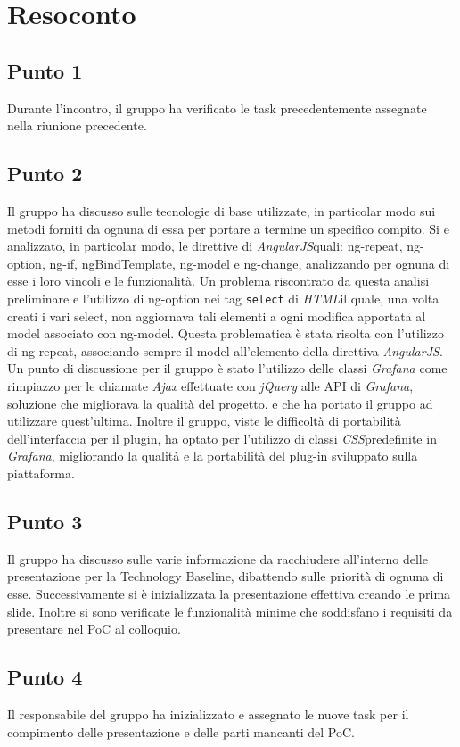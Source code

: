 \section{Resoconto}

\subsection{Punto 1}
Durante l'incontro, il gruppo ha verificato le task precedentemente assegnate nella riunione precedente. 

\subsection{Punto 2}
Il gruppo ha discusso sulle tecnologie di base utilizzate, in particolar modo sui metodi forniti da ognuna di essa per portare a termine un specifico compito. Si e analizzato, in particolar modo, le direttive di \textit{AngularJS}\glossario quali: ng-repeat, ng-option, ng-if, ngBindTemplate, ng-model e ng-change, analizzando per ognuna di esse i loro vincoli e le funzionalità. Un problema riscontrato da questa analisi preliminare e l'utilizzo di ng-option nei tag \texttt{select} di \textit{HTML}\glossario il quale, una volta creati i vari select, non aggiornava tali elementi a ogni modifica apportata al model associato con ng-model. Questa problematica è stata risolta con l'utilizzo di ng-repeat, associando sempre il model all'elemento della direttiva \textit{AngularJS}. Un punto di discussione per il gruppo è stato l'utilizzo delle classi \textit{Grafana} come rimpiazzo per le chiamate \textit{Ajax} effettuate con \textit{jQuery} alle API di \textit{Grafana}, soluzione che migliorava la qualità del progetto, e che ha portato il gruppo ad utilizzare quest'ultima. Inoltre il gruppo, viste le difficoltà di portabilità dell'interfaccia per il plugin, ha optato per l'utilizzo di classi \textit{CSS}\glossario predefinite in \textit{Grafana}, migliorando la qualità e la portabilità del plug-in sviluppato sulla piattaforma. 

\subsection{Punto 3}
Il gruppo ha discusso sulle varie informazione da racchiudere all'interno delle presentazione per la Technology Baseline, dibattendo sulle priorità di ognuna di esse. Successivamente si è inizializzata la presentazione effettiva creando le prima slide. Inoltre si sono verificate le funzionalità minime che soddisfano i requisiti da presentare nel PoC al colloquio. 

\subsection{Punto 4}
Il responsabile del gruppo ha inizializzato e assegnato le nuove task per il compimento delle presentazione e delle parti mancanti del PoC. 
